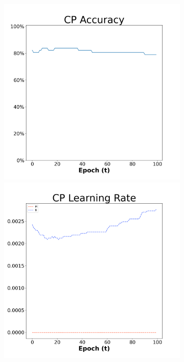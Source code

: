 \begin{figure}[H]
    \centering %
\begin{subfigure}{0.3\textwidth}
  \includegraphics[width=\linewidth]{images/exper1/breast/CP_0.01_acc.png}
    \includegraphics[width=\linewidth]{images/exper1/breast/CP_0.01_lr.png}

\end{subfigure}
\end{figure}
